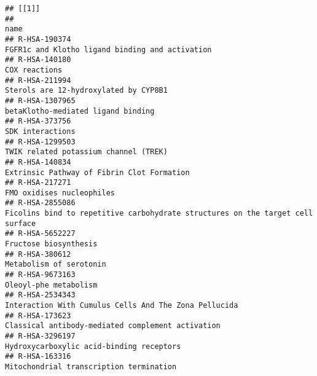 \documentclass[
]{article}
\begin{document}
\begin{verbatim}
## [[1]]
##                                                                                                                                               name
## R-HSA-190374                                                                                       FGFR1c and Klotho ligand binding and activation
## R-HSA-140180                                                                                                                         COX reactions
## R-HSA-211994                                                                                                 Sterols are 12-hydroxylated by CYP8B1
## R-HSA-1307965                                                                                                   betaKlotho-mediated ligand binding
## R-HSA-373756                                                                                                                      SDK interactions
## R-HSA-1299503                                                                                                TWIK related potassium channel (TREK)
## R-HSA-140834                                                                                            Extrinsic Pathway of Fibrin Clot Formation
## R-HSA-217271                                                                                                             FMO oxidises nucleophiles
## R-HSA-2855086                                                       Ficolins bind to repetitive carbohydrate structures on the target cell surface
## R-HSA-5652227                                                                                                                Fructose biosynthesis
## R-HSA-380612                                                                                                               Metabolism of serotonin
## R-HSA-9673163                                                                                                                Oleoyl-phe metabolism
## R-HSA-2534343                                                                                Interaction With Cumulus Cells And The Zona Pellucida
## R-HSA-173623                                                                                     Classical antibody-mediated complement activation
## R-HSA-3296197                                                                                             Hydroxycarboxylic acid-binding receptors
## R-HSA-163316                                                                                               Mitochondrial transcription termination

\end{verbatim}
\end{document}
